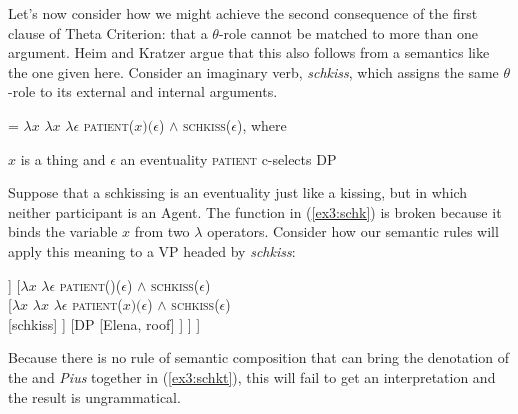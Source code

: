 Let's now consider how we might achieve the second consequence of the first clause of Theta Criterion: that a $\theta$-role cannot be matched to more than one argument. Heim and Kratzer argue that this also follows from a semantics like the one given here. %
%
%
%
Consider an imaginary verb, \emph{schkiss}, which assigns the same $\theta$-role to its external and internal arguments.
\begin{exe}
	\raggedright
	\ex \label{ex3:schk} 
	 = $\lambda x$ $\lambda x$ $\lambda \epsilon$ \textsc{patient}($x)(\epsilon$) $\wedge$ \textsc{schkiss}($\epsilon$), where
	\begin{xlist}
	\ex $x$ is a thing and $\epsilon$ an eventuality
	\ex \textsc{patient} c-selects DP
	\end{xlist}
\end{exe}
Suppose that a schkissing is an eventuality just like a kissing, but in which neither participant is an Agent. The function in (\ref{ex3:schk}) is broken because it binds the variable $x$ from two $\lambda$ operators. Consider how our semantic rules will apply this meaning to a VP headed by \emph{schkiss}:
\begin{exe}
	\raggedright
	\ex \label{ex3:schkt} 
	\small
	\begin{forest}
	[VP
		[DP [Pius, roof] ]
		[$\lambda x$ $\lambda \epsilon$ \textsc{patient}()($\epsilon$) $\wedge$ \textsc{schkiss}($\epsilon$)\\ 
			[$\lambda x$ $\lambda x$ $\lambda \epsilon$ \textsc{patient}($x)(\epsilon$) $\wedge$ \textsc{schkiss}($\epsilon$)\\  [schkiss] ]
			[DP [Elena, roof] ]
		 ]
	]
	\end{forest}
\end{exe}
Because there is no rule of semantic composition that can bring the denotation of the  and \emph{Pius} together in (\ref{ex3:schkt}), this will fail to get an interpretation and the result is ungrammatical.

